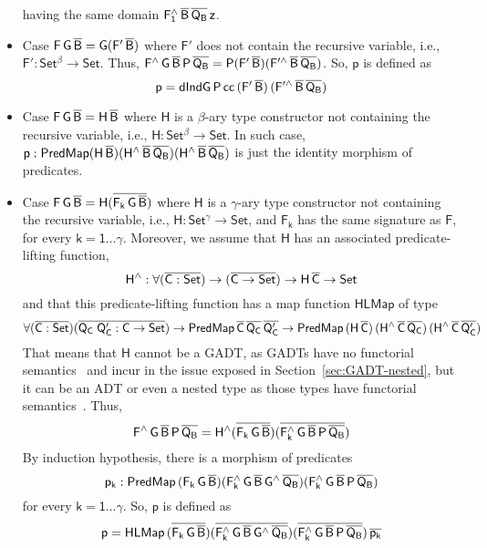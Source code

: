 \documentclass[9pt]{entcs} \usepackage{entcsmacro}
\begin{document}
\begin{itemize}
having the same domain $\mathsf{F_1^{\wedge}\,\overline{B}\,\overline{Q_B}\,z}$.
\item Case $\mathsf{F\,G\,\overline{B} = G(F'\,\overline{B})}$
where $\mathsf{F'}$ does not contain the recursive variable,
i.e., $\mathsf{F' : Set^\beta \to Set}$.
Thus, $\mathsf{F^{\wedge}\,G\,\overline{B}\,P\,\overline{Q_B} = P (F'\,\overline{B}) (F'^{\wedge}\,\overline{B}\,\overline{Q_B})}$.
So, $\mathsf{p}$ is defined as
\[
\mathsf{p = dIndG\,P\,cc\,(F'\,\overline{B})\,(F'^{\wedge}\,\overline{B}\,\overline{Q_B})}
\]
\item Case $\mathsf{F\,G\,\overline{B} = H\,\overline{B}}$
where $\mathsf{H}$ is a $\mathsf{\beta}$-ary type constructor not containing the recursive variable,
i.e., $\mathsf{H : Set^\beta \to Set}$.
In such case, $\mathsf{p : PredMap (H\,\overline{B}) (H^{\wedge}\,\overline{B}\,\overline{Q_B}) (H^{\wedge}\,\overline{B}\,\overline{Q_B})}$
is just the identity morphism of predicates.
\item Case $\mathsf{F\,G\,\overline{B} = H (\overline{F_k\,G\,\overline{B}})}$
where $\mathsf{H}$ is a $\mathsf{\gamma}$-ary type constructor not containing the recursive variable,
i.e., $\mathsf{H : Set^\gamma \to Set}$,
and $\mathsf{F_k}$ has the same signature as $\mathsf{F}$, for every $\mathsf{k = 1 \dots \gamma}$.
Moreover, we assume that $\mathsf{H}$ has an associated predicate-lifting function,
\[
\mathsf{H^{\wedge} : \forall (\overline{C : Set}) \to (\overline{C \to Set}) \to H\,\overline{C} \to Set}
\]
and that this predicate-lifting function has a map function $\mathsf{HLMap}$ of type
\[
\mathsf{\forall (\overline{C : Set}) (\overline{Q_C\;Q_C' : C \to Set}) \to PredMap\,\overline{C}\,\overline{Q_C}\,\overline{Q_C'}
\to PredMap\,(H\,\overline{C})\,(H^{\wedge}\,\overline{C}\,\overline{Q_C})\,(H^{\wedge}\,\overline{C}\,\overline{Q_C'})}
\]
That means that $\mathsf{H}$ cannot be a GADT,
as GADTs have no functorial semantics~\cite{HaskellPaper}
and incur in the issue exposed in Section~\ref{sec:GADT-nested},
but it can be an ADT or even a nested type as those types have functorial semantics~\cite{jp19,jgj21}.
Thus,
\[
\mathsf{F^{\wedge}\,G\,\overline{B}\,P\,\overline{Q_B} = H^{\wedge} (\overline{F_k\,G\,\overline{B}}) (\overline{F_k^{\wedge}\,G\,\overline{B}\,P\,\overline{Q_B}})}
\]
By induction hypothesis, there is a morphism of predicates
\[
\mathsf{p_k : PredMap\,(F_k\,G\,\overline{B}) (F_k^{\wedge}\,G\,\overline{B}\,G^{\wedge}\,\overline{Q_B}) (F_k^{\wedge}\,G\,\overline{B}\,P\,\overline{Q_B})}
\]
for every $\mathsf{k = 1 \dots \gamma}$.
So, $\mathsf{p}$ is defined as
\[
\mathsf{p
= HLMap\,(\overline{F_k\,G\,\overline{B}}) (\overline{F_k^{\wedge}\,G\,\overline{B}\,G^{\wedge}\,\overline{Q_B}}) (\overline{F_k^{\wedge}\,G\,\overline{B}\,P\,\overline{Q_B}})\,\overline{p_k}}
\]
\end{itemize}
\end{document}
